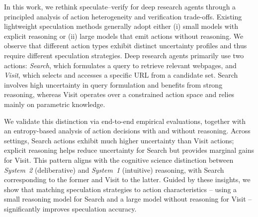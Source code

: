 In this work, we rethink speculate--verify for deep research agents through a principled analysis of action heterogeneity and verification trade-offs.
Existing lightweight speculation methods generally adopt either (i) small models with explicit reasoning or (ii) large models that emit actions without reasoning.
We observe that different action types exhibit distinct uncertainty profiles and thus require different speculation strategies.
Deep research agents primarily use two actions: \textit{Search}, which formulates a query to retrieve relevant webpages, and \textit{Visit}, which selects and accesses a specific URL from a candidate set.
Search involves high uncertainty in query formulation and benefits from strong reasoning, whereas Visit operates over a constrained action space and relies mainly on parametric knowledge.



We validate this distinction via end-to-end empirical evaluations, together with an entropy-based analysis of action decisions with and without reasoning.
Across settings, Search actions exhibit much higher uncertainty than Visit actions; explicit reasoning helps reduce uncertainty for Search but provides marginal gains for Visit.
This pattern aligns with the cognitive science distinction between \textit{System~2} (deliberative) and \textit{System~1} (intuitive) reasoning, with Search corresponding to the former and Visit to the latter.
Guided by these insights, we show that matching speculation strategies to action characteristics -- using a small reasoning model for Search and a large model without reasoning for Visit -- significantly improves speculation accuracy.


